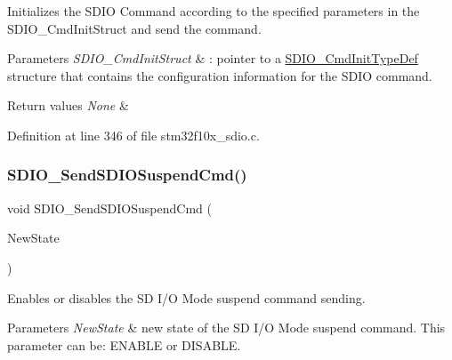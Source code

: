 Initializes the S\+D\+IO Command according to the specified parameters in the S\+D\+I\+O\+\_\+\+Cmd\+Init\+Struct and send the command. 


\begin{DoxyParams}{Parameters}
{\em S\+D\+I\+O\+\_\+\+Cmd\+Init\+Struct} & \+: pointer to a \hyperlink{struct_s_d_i_o___cmd_init_type_def}{S\+D\+I\+O\+\_\+\+Cmd\+Init\+Type\+Def} structure that contains the configuration information for the S\+D\+IO command. \\
\hline
\end{DoxyParams}

\begin{DoxyRetVals}{Return values}
{\em None} & \\
\hline
\end{DoxyRetVals}


Definition at line 346 of file stm32f10x\+\_\+sdio.\+c.

\mbox{\label{group___s_d_i_o___private___functions_ga9264137a01a1ab81d03bc80a3b3120fc}} 
\subsubsection{\texorpdfstring{S\+D\+I\+O\+\_\+\+Send\+S\+D\+I\+O\+Suspend\+Cmd()}{SDIO\_SendSDIOSuspendCmd()}}
{\footnotesize\ttfamily void S\+D\+I\+O\+\_\+\+Send\+S\+D\+I\+O\+Suspend\+Cmd (\begin{DoxyParamCaption}\item[{\hyperlink{group___exported__types_gac9a7e9a35d2513ec15c3b537aaa4fba1}{Functional\+State}}]{New\+State }\end{DoxyParamCaption})}



Enables or disables the SD I/O Mode suspend command sending. 


\begin{DoxyParams}{Parameters}
{\em New\+State} & new state of the SD I/O Mode suspend command. This parameter can be\+: E\+N\+A\+B\+LE or D\+I\+S\+A\+B\+LE. \\
\hline
\end{DoxyParams}

